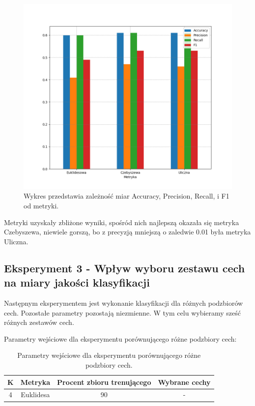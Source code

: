 \documentclass{classrep}
\begin{document}
\newpage

\begin{figure}[h!]
 \centering
 \includegraphics[width=15cm]{wykres_metryka.png}
 \vspace{-0.3cm}
 \caption{Wykres przedstawia zależność miar Accuracy, Precision, Recall, i F1 od metryki.}
 \label{wykres2}
\end{figure}

Metryki uzyskały zbliżone wyniki, spośród nich najlepszą okazała się metryka Czebyszewa, niewiele gorszą, bo z precyzją mniejszą o zaledwie 0.01 była metryka Uliczna. \\



\subsection{Eksperyment 3 - Wpływ wyboru zestawu cech na miary jakości klasyfikacji}
Następnym eksperymentem jest wykonanie klasyfikacji dla różnych podzbiorów cech. Pozostałe parametry pozostają niezmienne. W tym celu wybieramy sześć różnych zestawów cech. 

Parametry wejściowe dla eksperymentu porównującego różne podzbiory cech:
 
\begin{table}[h!]
\caption{Parametry wejściowe dla eksperymentu porównującego różne podzbiory cech. }
\centering
\vspace{0.1cm}
 \begin{tabular}{c c c c}
    \textbf{K} & \textbf{Metryka}   & \textbf{Procent zbioru trenującego}  & \textbf{Wybrane cechy}   \\
\hline
4 & Euklidesa & 90 & -\\
\end {tabular}
\label {Parametry wejściowe dla eksperymentu porównującego różne podzbiory cech. }
\end{table}
\end{document}
